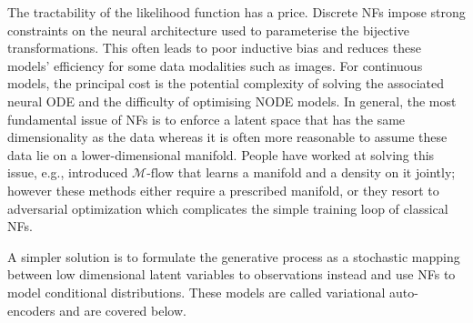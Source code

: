 The tractability of the likelihood function has a price. Discrete NFs impose strong constraints on the neural architecture used to parameterise the bijective transformations. This often leads to poor inductive bias and reduces these models' efficiency for some data modalities such as images. For continuous models, the principal cost is the potential complexity of solving the associated neural ODE and the difficulty of optimising NODE models. In general, the most fundamental issue of NFs is to enforce a latent space that has the same dimensionality as the data whereas it is often more reasonable to assume these data lie on a lower-dimensional manifold. People have worked at solving this issue, e.g., \citet{brehmer2020flows} introduced $\mathcal{M}\text{-flow}$ that learns a manifold and a density on it jointly; however these methods either require a prescribed manifold, or they resort to adversarial optimization which complicates the simple training loop of classical NFs.

A simpler solution is to formulate the generative process as a stochastic mapping between low dimensional latent variables to observations instead and use NFs to model conditional distributions. These models are called variational auto-encoders and are covered below.

